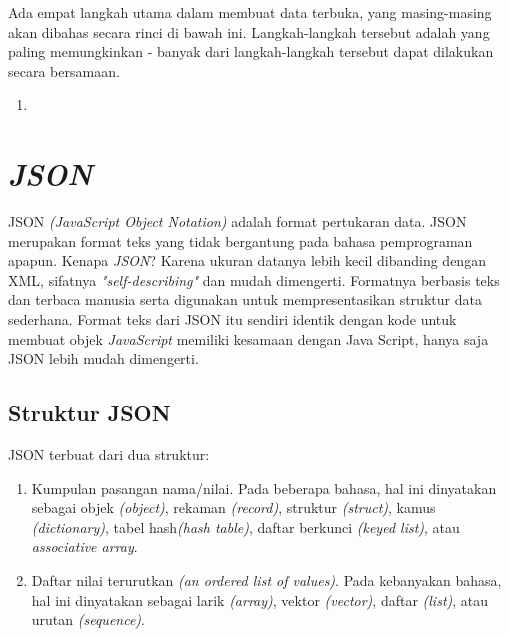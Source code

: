 Ada empat langkah utama dalam membuat data terbuka, yang masing-masing akan dibahas secara rinci di bawah ini. Langkah-langkah tersebut adalah yang paling memungkinkan - banyak dari langkah-langkah tersebut dapat dilakukan secara bersamaan. 
\begin{enumerate}
\item 
\end{enumerate}

\section{\textit{JSON}}
\label{sec: JSON}

JSON \textit{(JavaScript Object Notation)} adalah format pertukaran data. JSON merupakan format teks yang tidak bergantung pada bahasa pemprograman apapun. Kenapa \textit{JSON}? Karena ukuran datanya lebih kecil dibanding dengan XML, sifatnya \textit{"self-describing"} dan mudah dimengerti. Formatnya berbasis teks dan terbaca manusia serta digunakan untuk mempresentasikan struktur data sederhana. Format teks dari JSON itu sendiri identik dengan kode untuk membuat objek \textit{JavaScript} memiliki kesamaan dengan Java Script, hanya saja JSON lebih mudah dimengerti. 

\subsection{Struktur JSON}
\label{sec: Struktur JSON}
JSON terbuat dari dua struktur:
\begin{enumerate}
\item Kumpulan pasangan nama/nilai. Pada beberapa bahasa, hal ini dinyatakan sebagai objek \textit{(object)}, rekaman \textit{(record)}, struktur \textit{(struct)}, kamus \textit{(dictionary)}, tabel hash\textit{(hash table)}, daftar berkunci \textit{(keyed list)}, atau \textit{associative array}.
\item Daftar nilai terurutkan \textit{(an ordered list of values)}. Pada kebanyakan bahasa, hal ini dinyatakan sebagai larik \textit{(array)}, vektor \textit{(vector)}, daftar \textit{(list)}, atau urutan \textit{(sequence)}. 
\end{enumerate}

